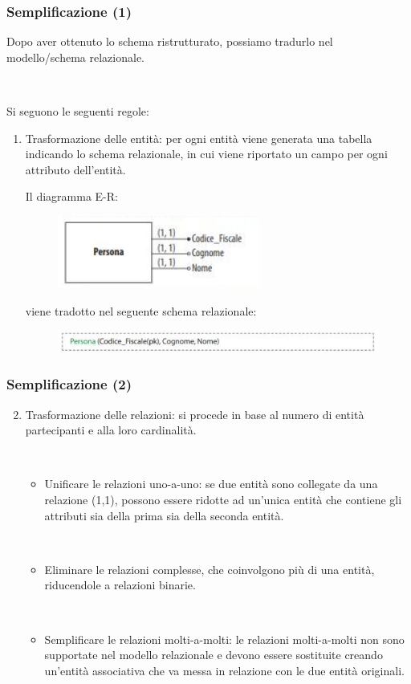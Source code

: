 \documentclass[]{beamer}
\begin{document}
\begin{frame}
\frametitle{Semplificazione (1)}
Dopo aver ottenuto lo schema ristrutturato, possiamo tradurlo nel modello/schema relazionale.

~

Si seguono le seguenti regole:
\begin{enumerate}
  \item \alert<1>{Trasformazione delle entità}: per ogni entità viene generata una tabella indicando lo schema relazionale, in cui viene riportato un campo per ogni attributo dell'entità.
  
  Il diagramma E-R:
  \begin{figure}
    \includegraphics[width=.4\columnwidth]{img/ristrutturazione3.png}
  \end{figure}
  viene tradotto nel seguente schema relazionale:
    \begin{figure}
      \includegraphics[width=.9\columnwidth]{img/ristrutturazione4.png}
    \end{figure}
\end{enumerate} 
\end{frame}


\begin{frame}
\frametitle{Semplificazione (2)}
\begin{enumerate}\setcounter{enumi}{1}
  \item \alert<1>{Trasformazione delle relazioni}: si procede in base al numero di entità partecipanti e alla loro cardinalità.\pause
  
  ~

  \begin{itemize}
    \item \alert<2>{Unificare le relazioni uno-a-uno}: se due entità sono collegate da una relazione (1,1), possono essere ridotte ad un'unica entità che contiene gli attributi sia della prima sia della seconda entità.\pause
    
    ~

    \item \alert<3>{Eliminare le relazioni complesse}, che coinvolgono più di una entità, riducendole a relazioni binarie.\pause
    
    ~

    \item \alert<4>{Semplificare le relazioni molti-a-molti}: le relazioni molti-a-molti non sono supportate nel modello relazionale e devono essere sostituite creando un'entità associativa che va messa in relazione con le due entità originali.
  \end{itemize}
\end{enumerate} 
\end{frame}
\end{document}
